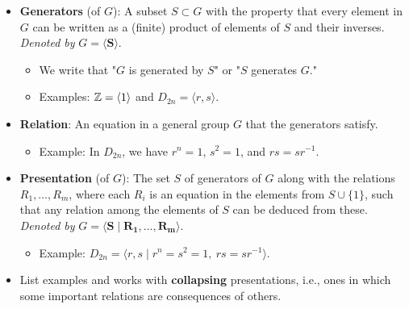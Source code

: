 \documentclass[../notes.tex]{subfiles}
\begin{document}
\begin{itemize}
    \item \textbf{Generators} (of $G$): A subset $S\subset G$ with the property that every element in $G$ can be written as a (finite) product of elements of $S$ and their inverses. \emph{Denoted by} $G=\bm{\langle S\rangle}$.
    \begin{itemize}
        \item We write that "$G$ is generated by $S$" or "$S$ generates $G$."
        \item Examples: $\mathbb{Z}=\langle 1\rangle$ and $D_{2n}=\langle r,s\rangle$.
    \end{itemize}
    \item \textbf{Relation}: An equation in a general group $G$ that the generators satisfy.
    \begin{itemize}
        \item Example: In $D_{2n}$, we have $r^n=1$, $s^2=1$, and $rs=sr^{-1}$.
    \end{itemize}
    \item \textbf{Presentation} (of $G$): The set $S$ of generators of $G$ along with the relations $R_1,\dots,R_m$, where each $R_i$ is an equation in the elements from $S\cup\{1\}$, such that any relation among the elements of $S$ can be deduced from these. \emph{Denoted by} $G=\bm{\langle S\mid R_1,...,R_m\rangle}$.
    \begin{itemize}
        \item Example: $D_{2n}=\langle r,s\mid r^n=s^2=1,\ rs=sr^{-1}\rangle$.
    \end{itemize}
    \item List examples and works with \textbf{collapsing} presentations, i.e., ones in which some important relations are consequences of others.
\end{itemize}
\end{document}
